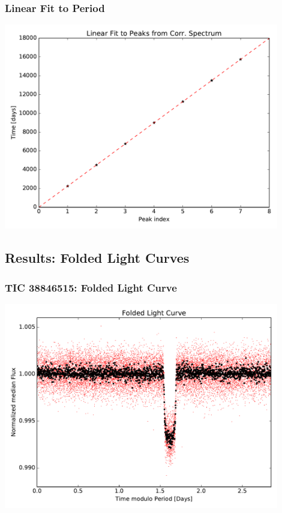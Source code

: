 \documentclass[notes]{beamer}
\begin{document}
\begin{frame}
\frametitle{Linear Fit to Period}
\centering
\includegraphics[width=0.9\textwidth]{../figures/2019-1-15_16:2:14_linear_fit_TIC38846515.pdf}
\end{frame}

\subsection{Results: Folded Light Curves}

\begin{frame}
\frametitle{TIC 38846515: Folded Light Curve}
\centering
\includegraphics[width=0.9\textwidth]{../figures/2019-1-15_16:2:14_Folded_TIC38846515.pdf}
\end{frame}
\end{document}
